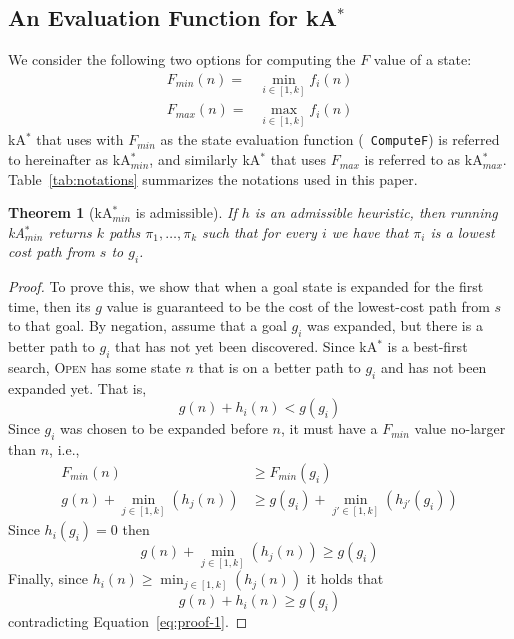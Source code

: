 \documentclass{aicom2e}
\newtheorem{theorem}{Theorem}
\newcommand{\astar}{A$^*$}
\newcommand{\kastar}{kA$^*$}
\newcommand{\kastarmin}{kA$^*_{min}$}
\newcommand{\kastarmax}{kA$^*_{max}$}
\newcommand{\open}{\textsc{Open}}
\begin{document}
\subsection{An Evaluation Function for \kastar{}}

We consider the following two options for computing the $F$ value of a state:
\begin{align}
F_{min}(n)=&\min_{i\in [1,k]}f_i(n) \\
F_{max}(n)=&\max_{i\in [1,k]}f_i(n)
\end{align}
\kastar{} that uses with $F_{min}$ as the state evaluation function ({\tt
ComputeF}) is referred to hereinafter as \kastarmin{}, and similarly \kastar{}
that uses $F_{max}$ is referred to as \kastarmax{}. Table~\ref{tab:notations}
summarizes the notations used in this paper.



\begin{theorem}[\kastarmin{} is admissible]
If $h$ is an admissible heuristic, then running \kastarmin{} returns $k$ paths
$\pi_1,\ldots, \pi_k$ such that for every $i$ we have that $\pi_i$ is a lowest cost
path from $s$ to $g_i$. \label{the:min-f}
\end{theorem}
 \begin{proof}
To prove this, we show that when a goal state is expanded for the first time,
then its $g$ value is guaranteed to be the cost of the lowest-cost path from
$s$ to that goal. By negation, assume that a goal $g_i$ was expanded, but there
is a better path to $g_i$ that has not yet been discovered. Since \kastar{} is
a best-first search, \open{} has some state $n$ that is on a better path to
$g_i$ and has not been expanded yet. That is,
\begin{equation}
g(n)+h_i(n)<g(g_i)
\label{eq:proof-1}
\end{equation}
Since $g_i$ was chosen to be expanded before $n$, it must have a $F_{min}$ value no-larger than $n$, i.e.,
\begin{align}
F_{min}(n) &\geq  F_{min}(g_i) \\
g(n)+\min_{j\in [1,k]}(h_j(n))& \geq  g(g_i)+\min_{j'\in [1,k]}(h_{j'}(g_i))
\end{align}
Since $h_i(g_i)=0$ then
\[ g(n)+\min_{j\in [1,k]}(h_j(n)) \geq  g(g_i) \]
Finally, since $h_i(n)\geq \min_{j\in [1,k]}(h_j(n))$ it holds that
\[ g(n)+h_i(n) \geq  g(g_i) \]
contradicting Equation~\ref{eq:proof-1}.
\end{proof}
\end{document}
